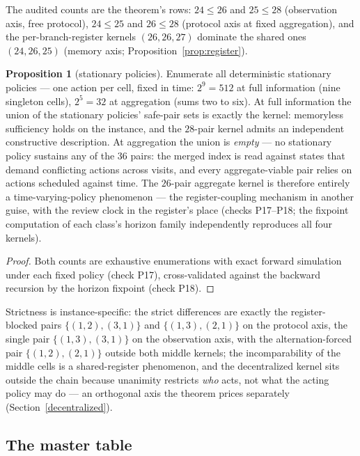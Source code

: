 \documentclass[10pt,twocolumn]{article}
\theoremstyle{definition}
\newtheorem{proposition}{Proposition}
\begin{document}
The audited counts are the theorem's rows: \(24 \le 26\) and
\(25 \le 28\) (observation axis, free protocol), \(24 \le 25\) and
\(26 \le 28\) (protocol axis at fixed aggregation), and the
per-branch-register kernels \((26, 26, 27)\) dominate the shared ones
\((24, 26, 25)\) (memory axis; Proposition~\ref{prop:register}).
\begin{proposition}[stationary policies]\label{prop:stationary}
Enumerate all deterministic stationary policies --- one action per cell,
fixed in time: \(2^{9} = 512\) at full information (nine singleton
cells), \(2^{5} = 32\) at aggregation (sums two to six). At full
information the union of the stationary policies' safe-pair sets is
exactly the kernel: memoryless sufficiency holds on the instance, and
the \(28\)-pair kernel admits an independent constructive description.
At aggregation the union is \emph{empty} --- no stationary policy
sustains any of the \(36\) pairs: the merged index is read against
states that demand conflicting actions across visits, and every
aggregate-viable pair relies on actions scheduled against time. The
\(26\)-pair aggregate kernel is therefore entirely a time-varying-policy
phenomenon --- the register-coupling mechanism in another guise, with
the review clock in the register's place (checks P17--P18; the fixpoint
computation of each class's horizon family independently reproduces all
four kernels).
\end{proposition}

\begin{proof}
Both counts are exhaustive enumerations with exact forward simulation
under each fixed policy (check P17), cross-validated against the
backward recursion by the horizon fixpoint (check P18).
\end{proof}

Strictness is instance-specific: the strict differences are exactly the
register-blocked pairs \(\{(1,2),(3,1)\}\) and \(\{(1,3),(2,1)\}\) on
the protocol axis, the single pair \(\{(1,3),(3,1)\}\) on the
observation axis, with the alternation-forced pair \(\{(1,2),(2,1)\}\)
outside both middle kernels; the incomparability of the
middle cells is a shared-register phenomenon, and the decentralized
kernel sits outside the chain because unanimity restricts \emph{who}
acts, not what the acting policy may do --- an orthogonal axis the
theorem prices separately (Section~\ref{decentralized}).

\subsection{The master table}\label{master}
\end{document}
